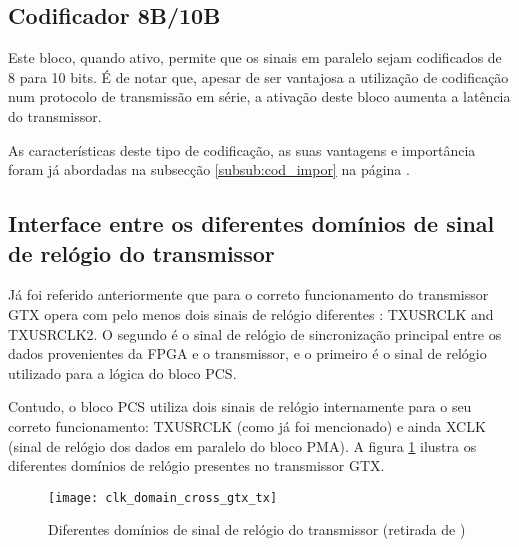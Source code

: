 \subsection{Codificador 8B/10B}

Este bloco, quando ativo, permite que os sinais em paralelo sejam codificados de 8 para 10 bits. É de notar que, apesar de ser vantajosa a utilização de codificação num protocolo de transmissão em série, a ativação deste bloco aumenta a latência do transmissor.

As características deste tipo de codificação, as suas vantagens e importância foram já abordadas na subsecção \ref{subsub:cod_impor} na página \pageref{subsub:cod_impor}.

%


\subsection{Interface entre os diferentes domínios de sinal de relógio do transmissor} \label{subsub:tx_buffer}

Já foi referido anteriormente que para o correto funcionamento do transmissor GTX opera com pelo menos dois sinais de relógio diferentes : TXUSRCLK and TXUSRCLK2. O segundo é o sinal de relógio de sincronização principal entre os dados provenientes da FPGA e o transmissor, e o primeiro é o sinal de relógio utilizado para a lógica do bloco PCS.

Contudo, o bloco PCS utiliza dois sinais de relógio internamente para o seu correto funcionamento: TXUSRCLK (como já foi mencionado) e ainda XCLK (sinal de relógio dos dados em paralelo do bloco PMA). A figura \ref{fig:clk_domains_tx} ilustra os diferentes domínios de relógio presentes no transmissor GTX.

\begin{figure}[h!]
	\begin{center}
		\leavevmode
		\texttt{[image: clk\_domain\_cross\_gtx\_tx]}
		\caption[Diferentes domínios de sinal de relógio do transmissor]{Diferentes domínios de sinal de relógio do transmissor (retirada de \cite{R011})}
		\label{fig:clk_domains_tx}
	\end{center}
\end{figure}

